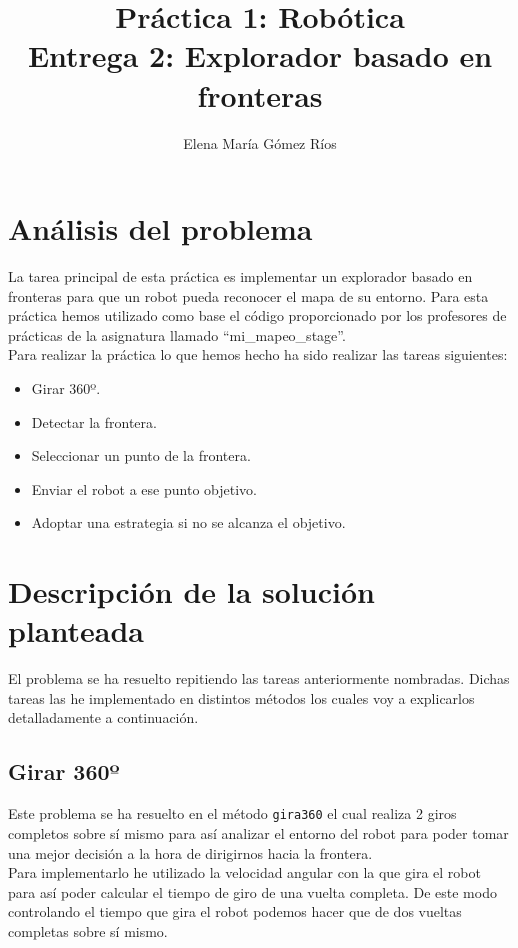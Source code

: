 \documentclass[11pt]{article}
\title{Práctica	1: Robótica \\
Entrega 2: Explorador basado en fronteras}
\author{ Elena María Gómez Ríos }
\begin{document}
\maketitle

\section{Análisis del problema}
La tarea principal de esta práctica es implementar un explorador basado en fronteras para que un robot pueda reconocer el mapa de su entorno. Para esta práctica hemos utilizado como base el código proporcionado por los profesores de prácticas de la asignatura llamado ``mi\_mapeo\_stage''.\\

Para realizar la práctica lo que hemos hecho ha sido realizar las tareas siguientes:
\begin{itemize}
	\item Girar 360º.
	\item Detectar la frontera.
	\item Seleccionar un punto de la frontera.
	\item Enviar el robot a ese punto objetivo.
	\item Adoptar una estrategia si no se alcanza el objetivo.
\end{itemize}


\section{Descripción de la solución planteada}

El problema se ha resuelto repitiendo las tareas anteriormente nombradas. Dichas tareas las he implementado en distintos métodos los cuales voy a explicarlos detalladamente a continuación.

\subsection{Girar 360º}
Este problema se ha resuelto en el método \texttt{gira360} el cual realiza 2 giros completos sobre sí mismo para así analizar el entorno del robot para poder tomar una mejor decisión a la hora de dirigirnos hacia la frontera.\\

Para implementarlo he utilizado la velocidad angular con la que gira el robot para así poder calcular el tiempo de giro de una vuelta completa. De este modo controlando el tiempo que gira el robot podemos hacer que de dos vueltas completas sobre sí mismo.\\
\end{document}
